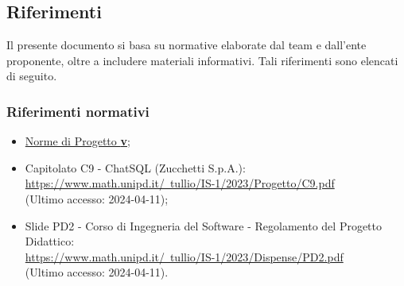 \subsection{Riferimenti}
Il presente documento si basa su normative elaborate dal team e dall'ente proponente, oltre a includere materiali informativi. Tali riferimenti sono elencati di seguito.
\subsubsection{Riferimenti normativi}
\begin{itemize}
  \item \href{https://github.com/Argo-swe/Argo-swe.github.io/tree/main/2 - RTB}{Norme di Progetto \textbf{v\VersioneNP}};
  \item Capitolato C9 - ChatSQL (Zucchetti S.p.A.): \\ \href{https://www.math.unipd.it/~tullio/IS-1/2023/Progetto/C9.pdf}{https://www.math.unipd.it/~tullio/IS-1/2023/Progetto/C9.pdf} \\ (Ultimo accesso: 2024-04-11);
  \item Slide PD2 - Corso di Ingegneria del Software - Regolamento del Progetto Didattico: \\ \href{https://www.math.unipd.it/~tullio/IS-1/2023/Dispense/PD2.pdf}{https://www.math.unipd.it/~tullio/IS-1/2023/Dispense/PD2.pdf} \\ (Ultimo accesso: 2024-04-11).
\end{itemize}

